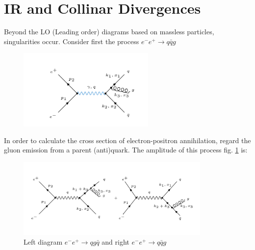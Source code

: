 \section{IR and Collinar Divergences}
\label{ir}
Beyond the LO (Leading order) diagrams based on massless particles, singularities occur. Consider first the process $ e^- e^+ \rightarrow q\bar{q}g $

\begin{figure}[ht!]
\centering
\includegraphics[width=0.6\textwidth]{images/Intro/IRCol.png}
\end{figure}

In order to calculate the cross section of electron-positron annihilation, regard the gluon emission from a parent (anti)quark. The amplitude of this process fig. \ref{IRCo} is:
\begin{figure}[h!]
\centering
\includegraphics[width=0.85\textwidth]{images/Intro/IRColMatrix.png}
\caption{Left diagram $  e^- e^+ \rightarrow qg\bar{q} $ and right $ e^- e^+ \rightarrow q\bar{q}g $}
\label{IRCo}
\end{figure}

